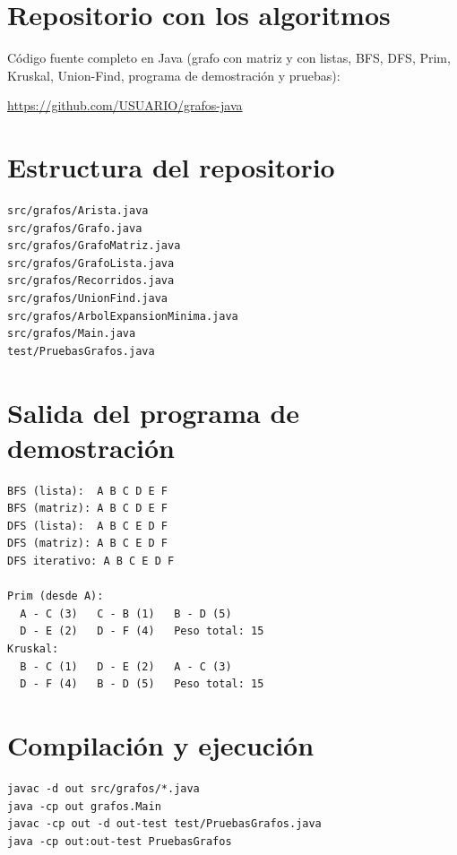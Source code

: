 \documentclass[conference]{IEEEtran}
\begin{document}
\appendices
\section{Repositorio con los algoritmos}
Código fuente completo en Java (grafo con matriz y con listas, BFS, DFS, Prim, Kruskal, Union-Find, programa de demostración y pruebas):

\noindent\url{https://github.com/USUARIO/grafos-java}

\section{Estructura del repositorio}
\begin{lstlisting}[language={},caption={Archivos del proyecto}]
src/grafos/Arista.java
src/grafos/Grafo.java
src/grafos/GrafoMatriz.java
src/grafos/GrafoLista.java
src/grafos/Recorridos.java
src/grafos/UnionFind.java
src/grafos/ArbolExpansionMinima.java
src/grafos/Main.java
test/PruebasGrafos.java
\end{lstlisting}

\section{Salida del programa de demostración}
\begin{lstlisting}[language={},caption={Salida de \texttt{java grafos.Main}}]
BFS (lista):  A B C D E F
BFS (matriz): A B C D E F
DFS (lista):  A B C E D F
DFS (matriz): A B C E D F
DFS iterativo: A B C E D F

Prim (desde A):
  A - C (3)   C - B (1)   B - D (5)
  D - E (2)   D - F (4)   Peso total: 15
Kruskal:
  B - C (1)   D - E (2)   A - C (3)
  D - F (4)   B - D (5)   Peso total: 15
\end{lstlisting}

\section{Compilación y ejecución}
\begin{lstlisting}[language={},caption={Comandos (Java 17 o superior)}]
javac -d out src/grafos/*.java
java -cp out grafos.Main
javac -cp out -d out-test test/PruebasGrafos.java
java -cp out:out-test PruebasGrafos
\end{lstlisting}
\end{document}
